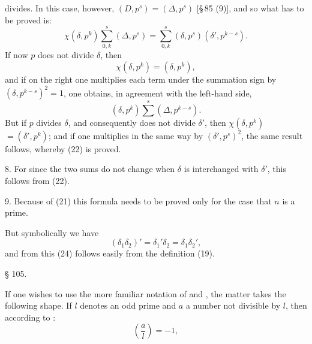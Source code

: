 divides. In this case, however, $(D, p^s) = (\Delta, p^s)$ [\S\,85 (9)],
and so what has to be proved is:
\[
\chi(\delta, p^k) \sum_{0,k}^{s} (\Delta, p^s) = \sum_{0,k}^{s} (\delta, p^s)(\delta', p^{k-s}).
\]
If now $p$ does not divide $\delta$, then
\[
\chi(\delta, p^k) = (\delta, p^k),
\]
and if on the right one multiplies each term under the summation sign by
$(\delta, p^{k-s})^2 = 1$, one obtains, in agreement with
the left-hand side,
\[
(\delta, p^k) \overset{s}{\sum} (\Delta, p^{k-s}). %
\]
But if $p$ divides $\delta$, and consequently does not divide $\delta'$, then $\chi(\delta, p^k)$
$= (\delta', p^k)$; and if one multiplies in the same way by $(\delta', p^s)^2$, the same
result follows, whereby (22) is proved.

8. 
For since the two sums do not change when $\delta$ is interchanged with
$\delta'$, this follows from (22).

9. 
Because of (21) this formula needs to be proved only for the case
that $n$ is a prime.

But symbolically we have
\[
(\delta_1\delta_2)' = \delta_1'\delta_2 = \delta_1\delta_2',
\]
and from this (24) follows easily from the definition (19).

\begin{center}
§ 105.\quad {}
\end{center}

If one wishes to use the more familiar notation of 
and , the matter takes the following shape.
If $l$ denotes an odd prime and $a$ a number not
divisible by $l$, then according to :
\[
\left(\frac{a}{l}\right) = -1,
\]
